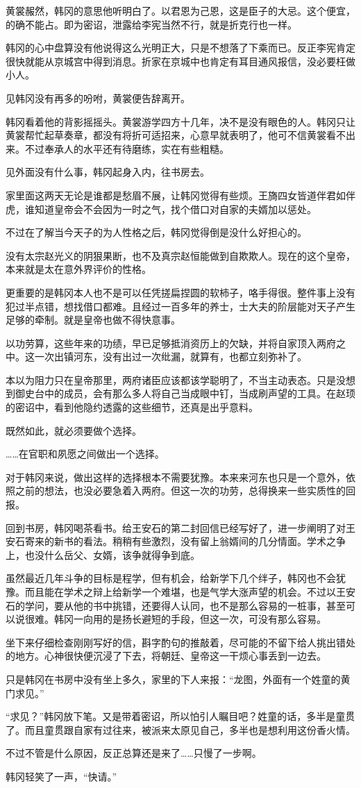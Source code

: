 黄裳赧然，韩冈的意思他听明白了。以君恩为己恩，这是臣子的大忌。这个便宜，的确不能占。即为密诏，泄露给李宪当然不行，就是折克行也一样。

韩冈的心中盘算没有他说得这么光明正大，只是不想落了下乘而已。反正李宪肯定很快就能从京城宫中得到消息。折家在京城中也肯定有耳目通风报信，没必要枉做小人。

见韩冈没有再多的吩咐，黄裳便告辞离开。

韩冈看着他的背影摇摇头。黄裳游学四方十几年，决不是没有眼色的人。韩冈只让黄裳帮忙起草奏章，都没有将折可适招来，心意早就表明了，他可不信黄裳看不出来。不过奉承人的水平还有待磨练，实在有些粗糙。

见外面没有什么事，韩冈起身入内，往书房去。

家里面这两天无论是谁都是愁眉不展，让韩冈觉得有些烦。王旖四女皆道伴君如伴虎，谁知道皇帝会不会因为一时之气，找个借口对自家的夫婿加以惩处。

不过在了解当今天子的为人性格之后，韩冈觉得倒是没什么好担心的。

没有太宗赵光义的阴狠果断，也不及真宗赵恒能做到自欺欺人。现在的这个皇帝，本来就是太在意外界评价的性格。

更重要的是韩冈本人也不是可以任凭搓扁捏圆的软柿子，咯手得很。整件事上没有犯过半点错，想找借口都难。且经过一百多年的养士，士大夫的阶层能对天子产生足够的牵制。就是皇帝也做不得快意事。

以功劳算，这些年来的功绩，早已足够抵消资历上的欠缺，并将自家顶入两府之中。这一次出镇河东，没有出过一次纰漏，就算有，也都立刻弥补了。

本以为阻力只在皇帝那里，两府诸臣应该都该学聪明了，不当主动表态。只是没想到御史台中的成员，会有那么多人将自己当成眼中钉，当成刷声望的工具。在赵顼的密诏中，看到他隐约透露的这些细节，还真是出乎意料。

既然如此，就必须要做个选择。

……在官职和夙愿之间做出一个选择。

对于韩冈来说，做出这样的选择根本不需要犹豫。本来来河东也只是一个意外，依照之前的想法，也没必要急着入两府。但这一次的功劳，总得换来一些实质性的回报。

回到书房，韩冈喝茶看书。给王安石的第二封回信已经写好了，进一步阐明了对王安石寄来的新书的看法。稍稍有些激烈，没有留上翁婿间的几分情面。学术之争上，也没什么岳父、女婿，该争就得争到底。

虽然最近几年斗争的目标是程学，但有机会，给新学下几个绊子，韩冈也不会犹豫。而且能在学术之辩上给新学一个难堪，也是气学大涨声望的机会。不过以王安石的学问，要从他的书中挑错，还要得人认同，也不是那么容易的一桩事，甚至可以说很难。韩冈一向用的是扬长避短的手段，但这一次，可没有那么容易。

坐下来仔细检查刚刚写好的信，斟字酌句的推敲着，尽可能的不留下给人挑出错处的地方。心神很快便沉浸了下去，将朝廷、皇帝这一干烦心事丢到一边去。

只是韩冈在书房中没有坐上多久，家里的下人来报：“龙图，外面有一个姓童的黄门求见。”

“求见？”韩冈放下笔。又是带着密诏，所以怕引人瞩目吧？姓童的话，多半是童贯了。而且童贯跟自家有过往来，被派来太原见自己，多半也是想利用这份香火情。

不过不管是什么原因，反正总算还是来了……只慢了一步啊。

韩冈轻笑了一声，“快请。”

